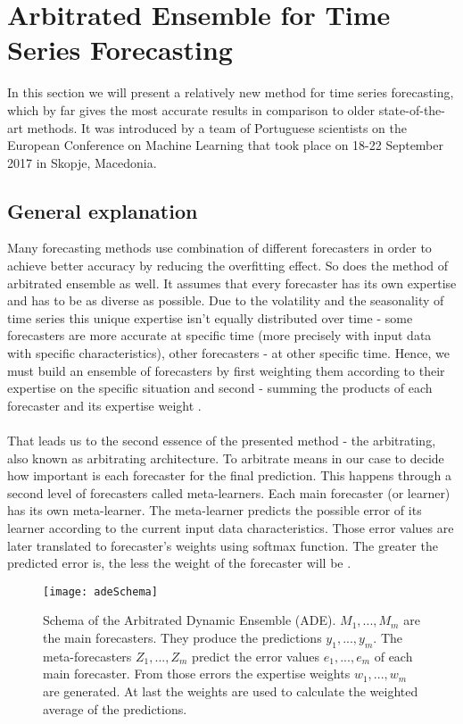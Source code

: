 \documentclass[runningheads,a4paper]{llncs}[2015/06/24]
\begin{document}
\section{Arbitrated Ensemble for Time Series Forecasting} In this section we will present a relatively new method for time series forecasting, which by far gives the most accurate results in comparison to older state-of-the-art methods. It was introduced by a team of Portuguese scientists on the European Conference on Machine Learning that took place on 18-22 September 2017 in Skopje, Macedonia. 

\subsection{General explanation}
\vspace{-\topsep}
Many forecasting methods use combination of different forecasters in order to achieve better accuracy by reducing the overfitting effect. So does the method of arbitrated ensemble as well. It assumes that every forecaster has its own expertise and has to be as diverse as possible. Due to the volatility and the seasonality of time series this unique expertise isn't equally distributed over time - some forecasters are more accurate at specific time (more precisely with input data with specific characteristics), other forecasters - at other specific time. Hence, we must build an ensemble of forecasters by first weighting them according to their expertise on the specific situation and second - summing the products of each forecaster and its expertise weight \cite{VtorCerqueira2017}. \\\\That leads us to the second essence of the presented method - the arbitrating, also known as arbitrating architecture. To arbitrate means in our case to decide how important is each forecaster for the final prediction. This happens through a second level of forecasters called meta-learners. Each main forecaster (or learner) has its own meta-learner. The meta-learner predicts the possible error of its learner according to the current input data characteristics. Those error values are later  translated to forecaster's weights using  softmax function. The greater the predicted error is, the less the weight of the forecaster will be \cite{VtorCerqueira2017}.
\vspace{-\topsep}

\begin{figure}[h]
\centering
\texttt{[image: adeSchema]}
\caption{Schema of the Arbitrated Dynamic Ensemble (ADE). $M_1, ... ,M_m$ are the main forecasters. They produce the predictions $y_1, ... ,y_m$. The meta-forecasters $Z_1, ... ,Z_m$ predict the error values $e_1, ... ,e_m$ of each main forecaster. From those errors the expertise weights $w_1, ... ,w_m$ are generated. At last the weights are used to calculate the weighted average of the predictions. \cite{VtorCerqueira2017}}
\label{fig:adeSchema}
\end{figure} 
 
\end{document}
